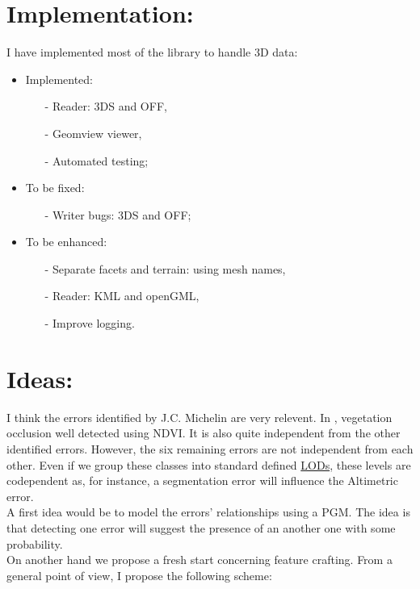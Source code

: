 \documentclass[a4paper, 11pt]{article}
\begin{document}
	\section*{Implementation:}
	I have implemented most of the library to handle 3D data:
	\begin{itemize}
		\item Implemented:
			\begin{itemize}
				\item[-] Reader: 3DS and OFF,
				\item[-] Geomview viewer,
				\item[-] Automated testing;
			\end{itemize}
		\item To be fixed:
			\begin{itemize}
				\item[-] Writer bugs: 3DS and OFF;
			\end{itemize}
		\item To be enhanced:
			\begin{itemize}
				\item[-] Separate facets and terrain: using mesh names,
				\item[-] Reader: KML and openGML,
				\item[-] Improve logging.
			\end{itemize}
	\end{itemize}
	
	\section*{Ideas:}
	I think the errors identified by J.C. Michelin are very relevent. In \cite{michelin2013quality}, vegetation occlusion well detected using NDVI. It is also quite independent from the other identified errors. However, the six remaining errors are not independent from each other. Even if we group these classes into standard defined \href{http://www.citygmlwiki.org/index.php/Basic_Information#Features_of_CityGML}{LODs}, these levels are codependent as, for instance, a segmentation error will influence the Altimetric error.\\
	
	A first idea would be to model the errors' relationships using a PGM. The idea is that detecting one error will suggest the presence of an another one with some probability.\\
	
	On another hand we propose a fresh start concerning feature crafting. From a general point of view, I propose the following scheme:
	
\end{document}
